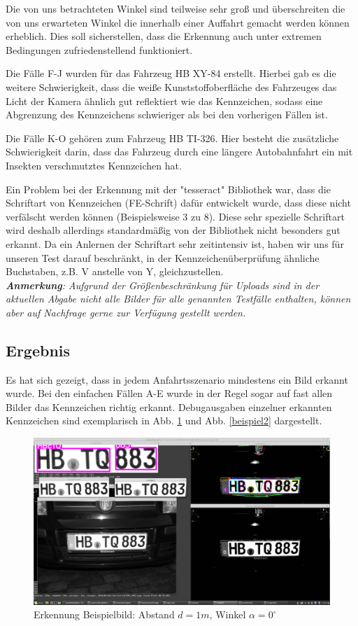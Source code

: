 \documentclass{../Vorlage/sebDenCls}
\begin{document}
Die von uns betrachteten Winkel sind teilweise sehr groß und überschreiten die von uns erwarteten Winkel die innerhalb einer Auffahrt gemacht werden können erheblich. Dies soll sicherstellen, dass die Erkennung auch unter extremen Bedingungen zufriedenstellend funktioniert.

Die Fälle F-J wurden für das Fahrzeug HB XY-84 erstellt. Hierbei gab es die weitere Schwierigkeit, dass die weiße Kunststoffoberfläche des Fahrzeuges das Licht der Kamera ähnlich gut reflektiert wie das Kennzeichen, sodass eine Abgrenzung des Kennzeichens schwieriger als bei den vorherigen Fällen ist.

Die Fälle K-O gehören zum Fahrzeug HB TI-326. Hier besteht die zusätzliche Schwierigkeit darin, dass das Fahrzeug durch eine längere Autobahnfahrt ein mit Insekten verschmutztes Kennzeichen hat.

Ein Problem bei der Erkennung mit der "tesseract" Bibliothek war, dass die Schriftart von Kennzeichen (FE-Schrift) dafür entwickelt wurde, dass diese nicht verfälscht werden können (Beispielsweise 3 zu 8). Diese sehr spezielle Schriftart wird deshalb allerdings standardmäßig von der Bibliothek nicht besonders gut erkannt. Da ein Anlernen der Schriftart sehr zeitintensiv ist, haben wir uns für unseren Test darauf beschränkt, in der Kennzeichenüberprüfung ähnliche Buchstaben, z.B. V anstelle von Y, gleichzustellen.\\

\textit{\textbf{Anmerkung}: Aufgrund der Größenbeschränkung für Uploads sind in der aktuellen Abgabe nicht alle Bilder für alle genannten Testfälle enthalten, können aber auf Nachfrage gerne zur Verfügung gestellt werden.}

\subsection{Ergebnis}
Es hat sich gezeigt, dass in jedem Anfahrtsszenario mindestens ein Bild erkannt wurde. Bei den einfachen Fällen A-E wurde in der Regel sogar auf fast allen Bilder das Kennzeichen richtig erkannt.
Debugausgaben einzelner erkannten Kennzeichen sind exemplarisch in Abb. \ref{beispiel} und Abb. \ref{beispiel2} dargestellt.

\begin{figure}[htp]
	\centering 	
	\includegraphics[width=.9\textwidth]{Funktioniert_1962.png} 
	\caption{Erkennung Beispielbild: Abstand $d=1m$, Winkel $\alpha = 0^\circ$ \label{beispiel}}
\end{figure}
\end{document}
